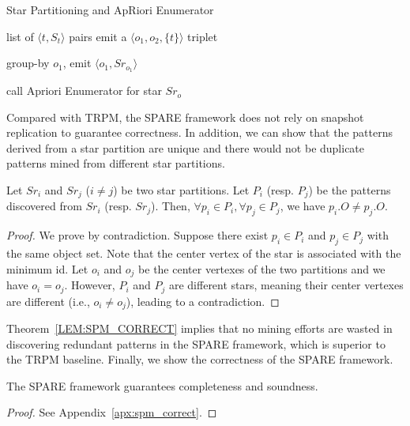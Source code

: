 \begin{algorithm}
\caption{Star Partitioning and ApRiori Enumerator}
\label{algo:spm_overview}
\begin{algorithmic}[1]
\Require list of $\langle t, S_t \rangle$ pairs
\label{code:spm-map-start}
	\State emit a $\langle o_1, o_2, \{t\}\rangle$ triplet~\label{code:spm-edge-direct}
	\EndFor
\EndFor
\label{code:spm-map-end}

\label{code:spm-shuffle-start}
	\State group-by $o_1$, emit $\langle o_1, Sr_{o_1} \rangle$ 
\EndFor
\label{code:spm-shuffle-end}

\label{code:spm-reduce-start}
\State call Apriori Enumerator for star $Sr_o$
\EndFor
\label{code:spm-reduce-end}

\end{algorithmic}
\end{algorithm}

Compared with TRPM, the SPARE framework does not rely on snapshot replication to guarantee correctness. In addition, we can show that the patterns derived from a star partition are unique and there would not be duplicate patterns mined from different star partitions.
\begin{theorem}
\label{LEM:SPM_CORRECT}
Let $Sr_i$ and $Sr_j$ ($i\neq j$) be two star partitions. Let $P_i$ (resp. $P_j$) be 
the patterns discovered from $Sr_i$ (resp. $Sr_j$). 
Then, $\forall p_i \in P_i, \forall p_j \in P_j$, we have $p_i.O \neq p_j.O$.
\end{theorem}
\begin{proof}
We prove by contradiction. Suppose there exist $p_i \in P_i$ and $p_j \in P_j$ with the same object set. Note that the center vertex of the star is associated with the minimum id. Let $o_i$ and $o_j$ be the center vertexes of the two partitions and we have $o_i=o_j$. However, $P_i$ and $P_j$ are different stars, meaning their center vertexes are different (i.e., $o_i\neq o_j$), leading to a contradiction. 
\end{proof}

Theorem~\ref{LEM:SPM_CORRECT} implies that no mining efforts are wasted in discovering redundant patterns  
in the SPARE framework, which is superior to the TRPM baseline. Finally, we show the correctness of the SPARE framework.
\begin{theorem}
\label{THM:SPM_CORRECT}
The SPARE framework guarantees completeness and soundness.
\end{theorem}
\vspace{-5 mm}
\begin{proof}
See Appendix~\ref{apx:spm_correct}.
\end{proof}
